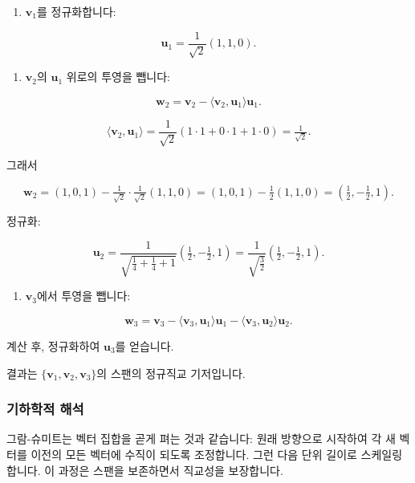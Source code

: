 \documentclass[
  12pt,
  a4paper,
]{article}
\begin{document}
\begin{enumerate}
\def\labelenumi{\arabic{enumi}.}
\item
  \(\mathbf{v}_1\)를 정규화합니다:
\end{enumerate}

\[\mathbf{u}_1 = \frac{1}{\sqrt{2}}(1,1,0).\]

\begin{enumerate}
\def\labelenumi{\arabic{enumi}.}
\item
  \(\mathbf{v}_2\)의 \(\mathbf{u}_1\) 위로의 투영을 뺍니다:
\end{enumerate}

\[\mathbf{w}_2 = \mathbf{v}_2 - \langle \mathbf{v}_2,\mathbf{u}_1 \rangle \mathbf{u}_1.\]

\[\langle \mathbf{v}_2,\mathbf{u}_1 \rangle = \frac{1}{\sqrt{2}}(1\cdot 1 + 0\cdot 1 + 1\cdot 0) = \tfrac{1}{\sqrt{2}}.\]

그래서

\[\mathbf{w}_2 = (1,0,1) - \tfrac{1}{\sqrt{2}}\cdot \tfrac{1}{\sqrt{2}}(1,1,0)
= (1,0,1) - \tfrac{1}{2}(1,1,0)
= \left(\tfrac{1}{2}, -\tfrac{1}{2}, 1\right).\]

정규화:

\[\mathbf{u}_2 = \frac{1}{\sqrt{\tfrac{1}{4}+\tfrac{1}{4}+1}} \left(\tfrac{1}{2}, -\tfrac{1}{2}, 1\right)
= \frac{1}{\sqrt{\tfrac{3}{2}}}\left(\tfrac{1}{2}, -\tfrac{1}{2}, 1\right).\]

\begin{enumerate}
\def\labelenumi{\arabic{enumi}.}
\item
  \(\mathbf{v}_3\)에서 투영을 뺍니다:
\end{enumerate}

\[\mathbf{w}_3 = \mathbf{v}_3 - \langle \mathbf{v}_3,\mathbf{u}_1 \rangle \mathbf{u}_1 - \langle \mathbf{v}_3,\mathbf{u}_2 \rangle \mathbf{u}_2.\]

계산 후, 정규화하여 \(\mathbf{u}_3\)를 얻습니다.

결과는 \(\{\mathbf{v}_1,\mathbf{v}_2,\mathbf{v}_3\}\)의 스팬의 정규직교 기저입니다.

\subsubsection{기하학적 해석}\label{geometric-interpretation-15}

그람-슈미트는 벡터 집합을 곧게 펴는 것과 같습니다: 원래 방향으로 시작하여 각 새 벡터를 이전의 모든 벡터에 수직이 되도록 조정합니다. 그런 다음 단위 길이로 스케일링합니다. 이 과정은 스팬을 보존하면서 직교성을 보장합니다.
\end{document}
